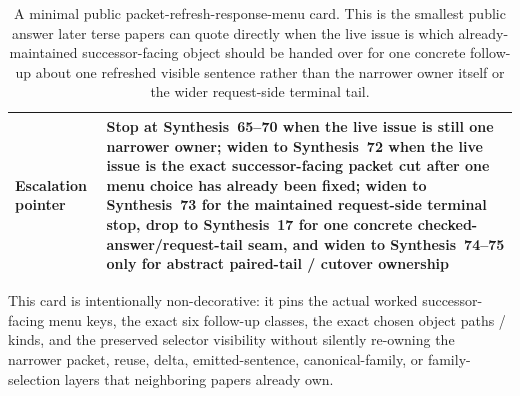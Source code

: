 \documentclass[11pt]{article}
\begin{document}
\begin{table}[t]
\begin{tabularx}{\linewidth}{@{}lX@{}}
Escalation pointer & Stop at Synthesis~65--70 when the live issue is still one narrower owner; widen to Synthesis~72 when the live issue is the exact successor-facing packet cut after one menu choice has already been fixed; widen to Synthesis~73 for the maintained request-side terminal stop, drop to Synthesis~17 for one concrete checked-answer/request-tail seam, and widen to Synthesis~74--75 only for abstract paired-tail / cutover ownership \\
\bottomrule
\end{tabularx}
\caption{A minimal public packet-refresh-response-menu card. This is the smallest public answer later terse papers can quote directly when the live issue is which already-maintained successor-facing object should be handed over for one concrete follow-up about one refreshed visible sentence rather than the narrower owner itself or the wider request-side terminal tail.}
\label{tab:minimal-public-packet-refresh-response-menu-card}
\end{table}

This card is intentionally non-decorative: it pins the actual worked successor-facing menu keys, the exact six follow-up classes, the exact chosen object paths / kinds, and the preserved selector visibility without silently re-owning the narrower packet, reuse, delta, emitted-sentence, canonical-family, or family-selection layers that neighboring papers already own.
\cite{series:workedexample}
\end{document}
